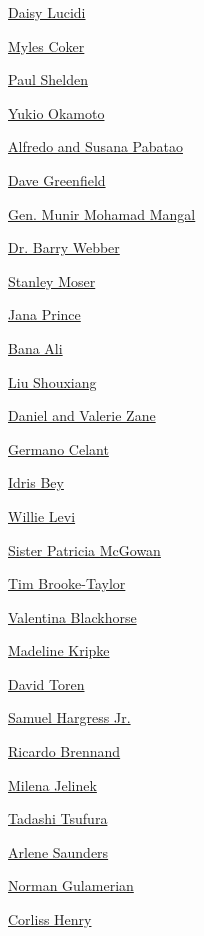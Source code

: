 \protect\hyperlink{daisy-lucidi}{Daisy Lucidi}

\protect\hyperlink{myles-coker}{Myles Coker}

\protect\hyperlink{paul-shelden}{Paul Shelden}

\protect\hyperlink{yukio-okamoto}{Yukio Okamoto}

\protect\hyperlink{alfredo-and-susana-pabatao}{Alfredo and Susana
Pabatao}

\protect\hyperlink{dave-greenfield}{Dave Greenfield}

\protect\hyperlink{gen-munir-mohamad-mangal}{Gen. Munir Mohamad Mangal}

\protect\hyperlink{dr-barry-webber-}{Dr. Barry Webber}

\protect\hyperlink{stanley-moser}{Stanley Moser}

\protect\hyperlink{jana-prince}{Jana Prince}

\protect\hyperlink{bana-ali}{Bana Ali}

\protect\hyperlink{liu-shouxiang}{Liu Shouxiang}

\protect\hyperlink{daniel-and-valerie-zane}{Daniel and Valerie Zane}

\protect\hyperlink{germano-celant}{Germano Celant}

\protect\hyperlink{idris-bey}{Idris Bey}

\protect\hyperlink{willie-levi}{Willie Levi}

\protect\hyperlink{sister-patricia-mcgowan}{Sister Patricia McGowan}

\protect\hyperlink{tim-brooketaylor}{Tim Brooke-Taylor}

\protect\hyperlink{valentina-blackhorse}{Valentina Blackhorse}

\protect\hyperlink{madeline-kripke}{Madeline Kripke}

\protect\hyperlink{david-toren}{David Toren}

\protect\hyperlink{samuel-hargress-jr}{Samuel Hargress Jr.}

\protect\hyperlink{ricardo-brennand}{Ricardo Brennand}

\protect\hyperlink{milena-jelinek}{Milena Jelinek}

\protect\hyperlink{tadashi-tsufura}{Tadashi Tsufura}

\protect\hyperlink{arlene-saunders}{Arlene Saunders}

\protect\hyperlink{norman-gulamerian}{Norman Gulamerian}

\protect\hyperlink{corliss-henry}{Corliss Henry}

